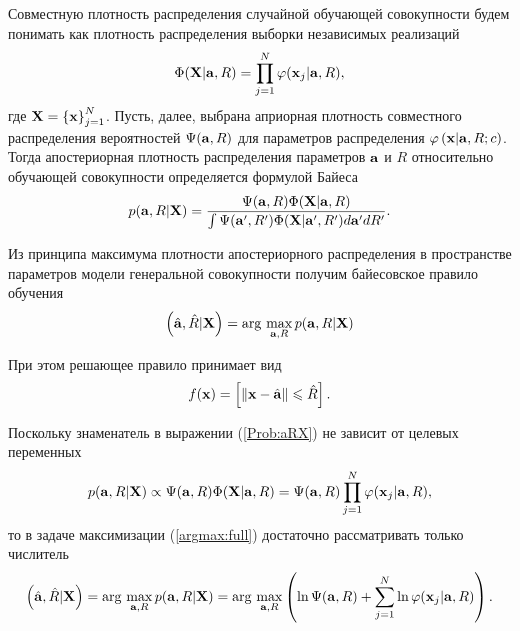 Совместную плотность распределения случайной обучающей совокупности будем понимать как плотность распределения выборки независимых реализаций
$$\Phi(\boldsymbol{\mathbf{X}}|\boldsymbol{\mathbf{a}},R)=\prod_{j=1}^N \varphi(\boldsymbol{\mathbf{x}}_j|\boldsymbol{\mathbf{a}},R),$$
где $\boldsymbol{\mathbf{X}}=\left\{\boldsymbol{\mathbf{x}}\right\}_{j=1}^N$.
Пусть, далее, выбрана априорная плотность совместного распределения вероятностей $\Psi(\boldsymbol{\mathbf{a}},R)$ для параметров распределения $\varphi \left(\boldsymbol{\mathbf{x}} | \boldsymbol{\mathbf{a}},R;c\right)$.
Тогда апостериорная плотность распределения параметров $\boldsymbol{\mathbf{a}}$ и $R$ относительно обучающей совокупности определяется формулой Байеса
\begin{equation}
	\label{Prob:aRX}
	p(\mb a,R|\mb X)
	= \frac {\Psi(\mb a,R) \Phi(\mb X|\mb a,R)}
			{\int {\Psi(\mb a',R') \Phi(\mb X|\mb a',R')d\mb a'dR'}}.
\end{equation}

Из принципа максимума плотности апостериорного распределения в пространстве параметров модели генеральной совокупности получим байесовское правило обучения
\begin{equation}
	\label{argmax:full}
	\cbr{\hat{\mb a},\hat R|\mb X} = \argmax_{\mb a,R} p(\mb a,R|\mb X)
\end{equation}

При этом решающее правило принимает вид
\begin{equation}
	\label{rule:basic}
	f(\mb x) = \sbr{\norm{\mb x - \hat{\mb a}} \le \hat R}.
\end{equation}

Поскольку знаменатель в выражении (\ref{Prob:aRX}) не зависит от целевых переменных
$$p(\boldsymbol{\mathbf{a}},R|\boldsymbol{\mathbf{X}})
	\propto \Psi(\boldsymbol{\mathbf{a}},R) \Phi(\boldsymbol{\mathbf{X}}|\boldsymbol{\mathbf{a}},R)
	=  \Psi(\boldsymbol{\mathbf{a}},R) \prod_{j=1}^N \varphi(\boldsymbol{\mathbf{x}}_j|\boldsymbol{\mathbf{a}},R),$$
то в задаче максимизации (\ref{argmax:full}) достаточно рассматривать только числитель
$$\left(\hat{\boldsymbol{\mathbf{a}}},\hat R|\boldsymbol{\mathbf{X}}\right)
	= \arg\,\max _{\boldsymbol{\mathbf{a}},R} p(\boldsymbol{\mathbf{a}},R|\boldsymbol{\mathbf{X}})
	= \arg\,\max _{\boldsymbol{\mathbf{a}},R} \left(\ln\Psi(\boldsymbol{\mathbf{a}},R) + \sum_{j=1}^N\ln\varphi(\boldsymbol{\mathbf{x}}_j|\boldsymbol{\mathbf{a}},R)\right). $$


